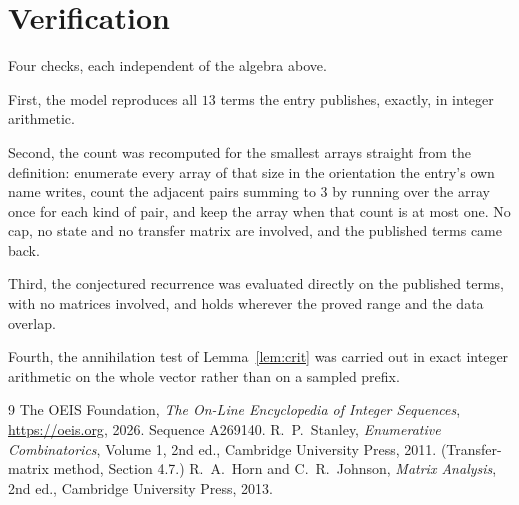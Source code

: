 \documentclass[11pt,a4paper]{article}
\theoremstyle{plain}
\theoremstyle{definition}
\begin{document}
\section{Verification}

Four checks, each independent of the algebra above.

First, the model reproduces all $13$ terms the entry publishes, exactly, in integer
arithmetic.

Second, the count was recomputed for the smallest arrays straight from the definition:
enumerate every array of that size in the orientation the entry's own name writes, count the
adjacent pairs summing to $3$ by running over the array once for each kind of pair, and keep
the array when that count is at most one. No cap, no state and no transfer matrix are involved, and
the published terms came back.

Third, the conjectured recurrence was evaluated directly on the published terms, with no
matrices involved, and holds wherever the proved range and the data overlap.

Fourth, the annihilation test of Lemma~\ref{lem:crit} was carried out in exact integer
arithmetic on the whole vector rather than on a sampled prefix.

\begin{thebibliography}{9}
 The OEIS Foundation, \emph{The On-Line Encyclopedia of Integer
Sequences}, \url{https://oeis.org}, 2026. Sequence A269140.
 R.~P.~Stanley, \emph{Enumerative Combinatorics}, Volume 1, 2nd ed.,
Cambridge University Press, 2011. (Transfer-matrix method, Section 4.7.)
 R.~A.~Horn and C.~R.~Johnson, \emph{Matrix Analysis}, 2nd ed., Cambridge
University Press, 2013.
\end{thebibliography}
\end{document}
